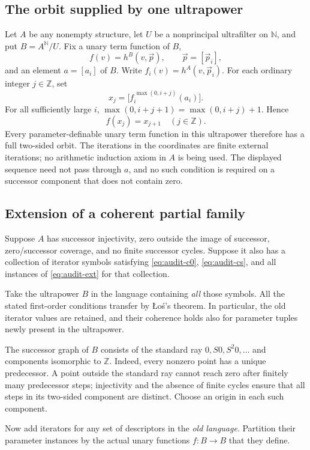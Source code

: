 \subsection{The orbit supplied by one ultrapower}

Let $A$ be any nonempty structure, let $U$ be a nonprincipal ultrafilter on
$\mathbb N$, and put $B=A^{\mathbb N}/U$. Fix a unary term function of $B$,
\[
 f(v)=h^B(v,\vec p),\qquad \vec p=[\vec p_i],
\]
and an element $a=[a_i]$ of $B$. Write
$f_i(v)=h^A(v,\vec p_i)$. For each ordinary integer $j\in\mathbb Z$, set
\[
 x_j=\bigl[f_i^{\,\max(0,i+j)}(a_i)\bigr].
\]
For all sufficiently large $i$,
$\max(0,i+j+1)=\max(0,i+j)+1$. Hence
\[
                         f(x_j)=x_{j+1}
                         \quad(j\in\mathbb Z).
\]
Every parameter-definable unary term function in this ultrapower therefore
has a full two-sided orbit. The iterations in the coordinates are finite
external iterations; no arithmetic induction axiom in $A$ is being used.
The displayed sequence need not pass through $a$, and no such condition is
required on a successor component that does not contain zero.

\subsection{Extension of a coherent partial family}

Suppose $A$ has successor injectivity, zero outside the image of successor,
zero/successor coverage, and no finite successor cycles. Suppose it also has
a collection of iterator symbols satisfying
\eqref{eq:audit-c0}, \eqref{eq:audit-cs}, and all instances of
\eqref{eq:audit-ext} for that collection.

Take the ultrapower $B$ in the language containing \emph{all} those symbols.
All the stated first-order conditions transfer by \L o\'s's theorem.
In particular, the old iterator values are retained, and their coherence
holds also for parameter tuples newly present in the ultrapower.

The successor graph of $B$ consists of the standard ray
$0,S0,S^2 0,\ldots$ and components isomorphic to $\mathbb Z$.
Indeed, every nonzero point has a unique predecessor. A point outside the
standard ray cannot reach zero after finitely many predecessor steps;
injectivity and the absence of finite cycles ensure that all steps in its
two-sided component are distinct. Choose an origin in each such component.

Now add iterators for any set of descriptors in the \emph{old language}.
Partition their parameter instances by the actual unary functions
$f:B\to B$ that they define.

